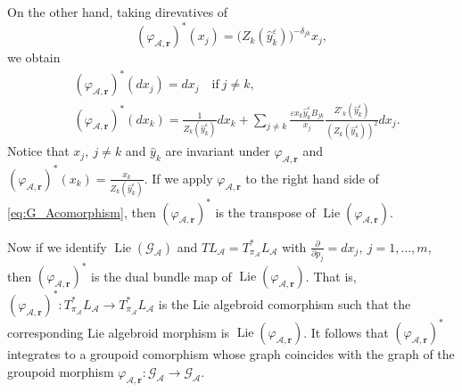 \documentclass{amsart}
\numberwithin{equation}{section}
\newcommand{\bfr}{{\boldsymbol{r}}}
\newcommand{\cA}{\mathcal{A}}
\newcommand{\cG}{\mathcal{G}}
\newcommand{\Lie}{\operatorname{Lie}}
\begin{document}
On the other hand, taking direvatives of
\[
	(\varphi_{\cA,\bfr})^*(x_j) = \big(Z_k(\hat{y}_k^\varepsilon)\big)^{-\delta_{jk}}x_j,
\]
we obtain
\begin{align}
	& (\varphi_{\cA,\bfr})^* (dx_j) = dx_j \quad \text{if}~j\ne k, \\
	& (\varphi_{\cA,\bfr})^* (dx_k) = \frac{1}{Z_k(\hat{y}_k^\varepsilon)} dx_k + \sum\limits_{j\ne k} \frac{\varepsilon x_k \hat{y}_k^\varepsilon B_{jk}}{x_j} \frac{Z'_k(\hat{y}_k^\varepsilon)}{\left(Z_k(\hat{y}_k^\varepsilon)\right)^2} dx_j. \label{eq:G_Acomorphism}
\end{align}
Notice that $x_j, \> j \ne k$ and $\hat{y}_k$ are invariant under $\varphi_{\cA,\bfr}$ and $(\varphi_{\cA,\bfr})^*(x_k) = \frac{x_k}{Z_k(\hat{y}_k^\varepsilon)}$. If we apply $\varphi_{\cA,\bfr}$ to the right hand side of \eqref{eq:G_Acomorphism}, then $(\varphi_{\cA,\bfr})^*$ is the transpose of $\Lie \left(\varphi_{\cA,\bfr} \right)$.

Now if we identify $\Lie \left(\cG_\cA \right)$ and $T L_\cA = T^*_{\pi_\cA} L_\cA$ with $\frac{\partial}{\partial p_j} = dx_j, \> j =1, \ldots, m$, then $(\varphi_{\cA,\bfr})^*$ is the dual bundle map of $\Lie \left(\varphi_{\cA,\bfr} \right)$. That is, $(\varphi_{\cA,\bfr})^*: T^*_{\pi_\cA} L_\cA \to T^*_{\pi_\cA} L_\cA$ is the Lie algebroid comorphism such that the corresponding Lie algebroid morphism is $\Lie \left(\varphi_{\cA,\bfr} \right)$. It follows that $(\varphi_{\cA,\bfr})^*$ integrates to a groupoid comorphism whose graph coincides with the graph of the groupoid morphism $\varphi_{\cA,\bfr}: \cG_\cA \to \cG_\cA$.
\end{document}
